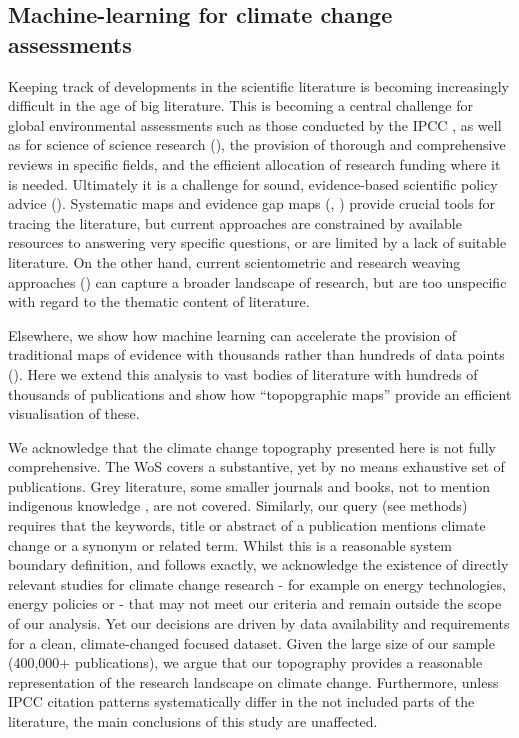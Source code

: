 \documentclass{article}
\begin{document}
\begin{linenumbers}
		\subsection*{Machine-learning for climate change assessments}%
		Keeping track of developments in the scientific literature is becoming increasingly difficult in the age of big literature. This is becoming a central challenge for global environmental assessments such as those conducted by the IPCC \cite{Minx2017l, Kowarsch2017}, as well as for science of science research (\cite{Zeng2017}), the provision of thorough and comprehensive reviews in specific fields, and the efficient allocation of research funding where it is needed. Ultimately it is a challenge for sound, evidence-based scientific policy advice (\cite{White2019}). Systematic maps and evidence gap maps (\cite{James2016}, \cite{McKinnon2015}) provide crucial tools for tracing the literature, but current approaches are constrained by available resources to answering very specific questions, or are limited by a lack of suitable literature.  On the other hand, current scientometric and research weaving approaches (\cite{Nakagawa2019}) can capture a broader landscape of research, but are too unspecific with regard to the thematic content of literature. 
		
		Elsewhere, we show how machine learning can accelerate the provision of traditional maps of evidence with thousands rather than hundreds of data points (\cite{Lamb2018d}). Here we extend this analysis to vast bodies of literature with hundreds of thousands of publications and show how ``topopgraphic maps'' provide an efficient visualisation of these. 
		
		We acknowledge that the climate change topography presented here is not fully comprehensive. The WoS  covers a substantive, yet by no means exhaustive set of publications. Grey literature, some smaller journals and books, not to mention indigenous knowledge \cite{Ford2016b}, are not covered. Similarly, our query (see methods) requires that the keywords, title or abstract of a publication mentions climate change or a synonym or related term. Whilst this is a reasonable system boundary definition, and follows \cite{Grieneisen2011} exactly, we acknowledge the existence of directly relevant studies for climate change research - for example on energy technologies, energy policies or - that may not meet our criteria and remain outside the scope of our analysis. Yet our decisions are driven by data availability and requirements for a clean, climate-changed focused dataset. Given the large size of our sample (400,000+ publications), we argue that our topography provides a reasonable representation of the research landscape on climate change. Furthermore, unless IPCC citation patterns systematically differ in the not included parts of the literature, the main conclusions of this study are unaffected. 
		

\end{linenumbers}
\end{document}
